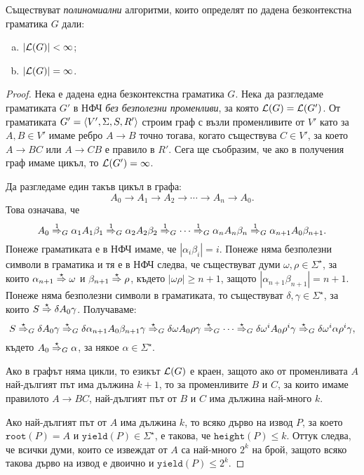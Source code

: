 \begin{theorem}
  Съществуват \emph{полиномиални} алгоритми, които определят по дадена безконтекстна граматика $G$ дали:
  \begin{enumerate}[a)]
  \item
    $\vert{\mathcal{L}(G)}\vert < \infty$;
  \item
    $\vert{\mathcal{L}(G)}\vert = \infty$.
  \end{enumerate}
\end{theorem}
\begin{proof}
  Нека е дадена една безконтекстна граматика $G$.
  Нека да разгледаме граматиката $G'$ в НФЧ {\em без безполезни променливи}, за която $\mathcal{L}(G) = \mathcal{L}(G')$.
  От граматиката $G' = \langle{V',\Sigma,S,R'}\rangle$ строим граф с възли променливите от $V'$ като
  за $A,B \in V'$ имаме ребро $A \to B$ точно тогава, когато съществува $C \in V'$,
  за което $A \to BC$ или $A \to CB$ е правило в $R'$.
  Сега ще съобразим, че ако в получения граф имаме цикъл, то $\mathcal{L}(G') = \infty$.

  Да разгледаме един такъв цикъл в графа:
  \[A_0 \to A_1 \to A_2 \to \cdots \to A_n \to A_0.\]
  Това означава, че 
  \[A_0 \stackrel{{1}}{\Rightarrow}_G \alpha_1 A_1 \beta_1 \stackrel{{1}}{\Rightarrow}_G \alpha_2 A_2 \beta_2 \stackrel{{1}}{\Rightarrow}_G \cdots \stackrel{{1}}{\Rightarrow}_G \alpha_n A_n \beta_n \stackrel{{1}}{\Rightarrow}_G \alpha_{n+1} A_0 \beta_{n+1}.\]
  Понеже граматиката е в НФЧ имаме, че $|\alpha_i\beta_i| = i$.
  Понеже няма безполезни символи в граматика и тя е в НФЧ следва, че съществуват думи $\omega,\rho \in \Sigma^\star$, за които $\alpha_{n+1} \stackrel{{\star}}{\Rightarrow} \omega$ и $\beta_{n+1} \stackrel{{\star}}{\Rightarrow} \rho$,
  където $|\omega\rho| \geq n+1$, защото $|\alpha_{n+1}\beta_{n+1}| = n+1$.
  Понеже няма безполезни символи в граматиката, то съществуват $\delta, \gamma \in \Sigma^\star$, за които
  $S \stackrel{{\star}}{\Rightarrow} \delta  A_0 \gamma$. Получаваме:
  \[ S \stackrel{{\star}}{\Rightarrow}_G \delta A_0 \gamma \stackrel{{\star}}{\Rightarrow}_G \delta \alpha_{n+1} A_0 \beta_{n+1} \gamma \stackrel{{\star}}{\Rightarrow}_G \delta \omega A_0 \rho\gamma \stackrel{{\star}}{\Rightarrow}_G \cdots \stackrel{{\star}}{\Rightarrow}_G \delta \omega^i A_0 \rho^i \gamma \stackrel{{\star}}{\Rightarrow}_G \delta\omega^i\alpha\rho^i\gamma,\]
  където $A_0 \stackrel{{\star}}{\Rightarrow}_G \alpha$, за някое $\alpha \in \Sigma^\star$.

  Ако в графът няма цикли, то езикът $\mathcal{L}(G)$ е краен, защото ако от променливата $A$ най-дългият път има дължина $k+1$,
  то за променливите $B$ и $C$, за които имаме правилото $A\to BC$, най-дългият път от $B$ и $C$ има дължина най-много $k$.

  Ако най-дългият път от $A$ има дължина $k$, то всяко дърво на извод $P$, за което $\texttt{root}(P) = A$ и $\texttt{yield}(P) \in \Sigma^\star$,
  е такова, че $\texttt{height}(P) \leq k$. Оттук следва, че всички думи, които се извеждат от $A$ са най-много $2^{k}$ на брой,
  защото всяко такова дърво на извод е двоично и $\texttt{yield}(P) \leq 2^k$.
\end{proof}


